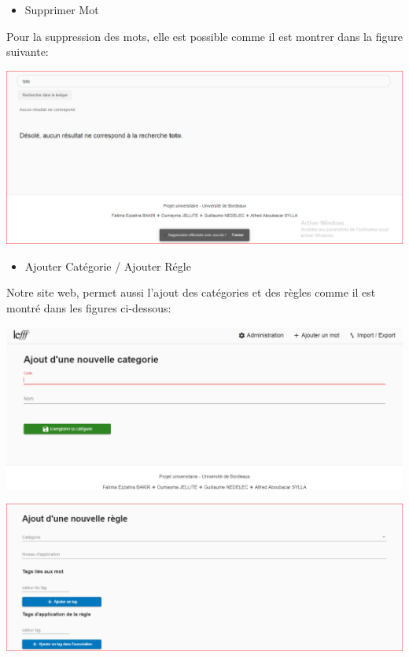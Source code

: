 \documentclass[12pt,a4paper]{article}
\begin{document}
\begin{itemize}  
  \item Supprimer Mot
\end{itemize}
Pour la suppression des mots, elle est possible comme il est montrer dans la figure suivante:

\includegraphics[width=150mm]{img/SuppressionEffectuer.PNG}


\begin{itemize}  
  \item Ajouter Catégorie / Ajouter Régle 
\end{itemize}

Notre site web, permet aussi l'ajout des catégories et des règles comme il est montré dans les figures ci-dessous: 


 \includegraphics[width=150mm]{img/AjouterCat.PNG}


 \includegraphics[width=150mm]{img/AjouterReg1.PNG}
 
\end{document}
